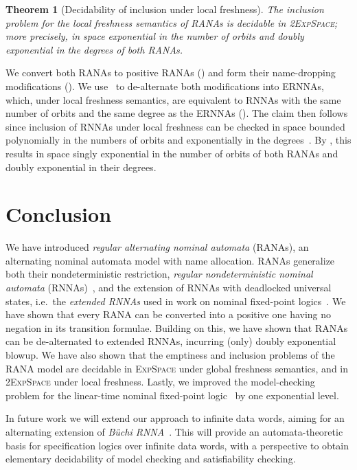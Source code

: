 \documentclass[10pt,a4paper]{amsart}
\newtheorem{theo}{Theorem}[section]
\theoremstyle{definition}
\renewcommand{\textsf}[1]{{\oldtextsf{\small#1}}}
\newcommand{\muBar}{\mbox{\textsf{Bar-$\mu$TL}}\xspace}
\newcommand{\EXPSPACE}{\textsc{ExpSpace}\xspace}
\begin{document}
\begin{theo}[Decidability of inclusion under local freshness]
  The inclusion problem for the local freshness semantics of RANAs is decidable
  in 2\EXPSPACE; more precisely, in space exponential in the number
  of orbits and doubly exponential in the degrees of both RANAs.
\end{theo}
\begin{IEEEproof}
  We convert both RANAs to positive RANAs
  ()
  and form their name-dropping modifications
  ().  We use~ to
  de-alternate both modifications into ERNNAs, which, under local
  freshness semantics, are equivalent to RNNAs with the same number of
  orbits and the same degree as the ERNNAs (\cite[Rem.~5.2]{hms21}). The
  claim then follows since %
  inclusion of RNNAs under local
  freshness can be checked in space bounded polynomially in the numbers
  of orbits and exponentially in the degrees~\cite[Cor.~7.4]{skmw17}. By
  , this results in space singly
  exponential in the number of orbits of both RANAs and doubly
  exponential in their degrees.
\end{IEEEproof}



\section{Conclusion}\label{sec:concl}

We have introduced \emph{regular alternating nominal automata}
  (RANAs), an alternating nominal automata model with name
allocation. RANAs generalize both their nondeterministic restriction,
\emph{regular nondeterministic nominal automata} (\mbox{RNNAs})~\cite{skmw17}, and the extension of RNNAs with deadlocked
universal states, i.e.~the \emph{extended RNNAs }used in work on
nominal fixed-point logics~\cite{hms21}.  We have shown that every
RANA can be converted into a positive one having no negation in its
transition formulae. Building on this, we have shown that
RANAs can be de-alternated to extended RNNAs, incurring (only)
doubly exponential blowup.  We have also shown that the emptiness and
inclusion problems of the RANA model are decidable in
\EXPSPACE under global freshness semantics, and in
2\EXPSPACE under local freshness. Lastly, we improved the
model-checking problem for the linear-time nominal fixed-point logic
\muBar~by one exponential level.

In future work we will extend our approach to infinite data words, aiming for an
alternating extension of \emph{Büchi RNNA}~\cite{uhms21}. This will provide an
automata-theoretic basis for specification logics over infinite data words, with a perspective to
obtain elementary decidability of model checking and satisfiability checking.
\end{document}

